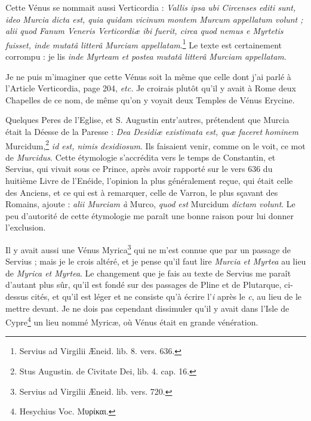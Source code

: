 \documentclass[a4paper, 11pt, oneside, polutonikogreek, french]{article}
\begin{document}
Cette Vénus se nommait aussi Verticordia : \emph{Vallis ipsa ubi Circenses editi sunt, ideo Murcia dicta est, quia quidam vicinum montem Murcum appellatum volunt ; alii quod Fanum Veneris Verticordiæ ibi fuerit, circa quod nemus e Myrtetis fuisset, inde mutatâ litterâ Murciam appellatam}.\footnote{Servius ad Virgilii Æneid. lib. 8. vers. 636.} Le texte est certainement corrompu : je lis \emph{inde Myrteam et postea mutatâ litterâ Murciam appellatam}.

Je ne puis m'imaginer que cette Vénus soit la même que celle dont j'ai parlé à l'Article Verticordia, page 204, \emph{etc.} Je croirais plutôt qu'il y avait à Rome deux Chapelles de ce nom, de même qu'on y voyait deux Temples de Vénus Erycine.

Quelques Peres de l'Eglise, et S. Augustin entr'autres, prétendent que Murcia était la Déesse de la Paresse : \emph{Dea Desidiæ existimata est, quæ faceret hominem} Murcidum,\footnote{Stus Augustin. de Civitate Dei, lib. 4. cap. 16.} \emph{id est, nimis desidiosum}. Ils faisaient venir, comme on le voit, ce mot de \emph{Murcidus}. Cette étymologie s'accrédita vers le temps de Constantin, et Servius, qui vivait sous ce Prince, après avoir rapporté sur le vers 636 du huitième Livre de l'Enéide, l'opinion la plus généralement reçue, qui était celle des Anciens, et ce qui est à remarquer, celle de Varron, le plus sçavant des Romains, ajoute : \emph{alii Murciam à} Murco, \emph{quod est} Murcidum \emph{dictam volunt}. Le peu d'autorité de cette étymologie me paraît une bonne raison pour lui donner l'exclusion.

Il y avait aussi une Vénus Myrica\footnote{Servius ad Virgilii Æneid. lib. vers. 720.} qui ne m'est connue que par un passage de Servius ; mais je le crois altéré, et je pense qu'il faut lire \emph{Murcia et Myrtea} au lieu de \emph{Myrica et Myrtea}. Le changement que je fais au texte de Servius me paraît d'autant plus sûr, qu'il est fondé sur des passages de Pline et de Plutarque, ci-dessus cités, et qu'il est léger et ne consiste qu'à écrire l'\emph{i} après le \emph{c}, au lieu de le mettre devant. Je ne dois pas cependant dissimuler qu'il y avait dans l'Isle de Cypre\footnote{Hesychius Voc. Μυρίκαι.} un lieu nommé Myricæ, où Vénus était en grande vénération.
\end{document}
